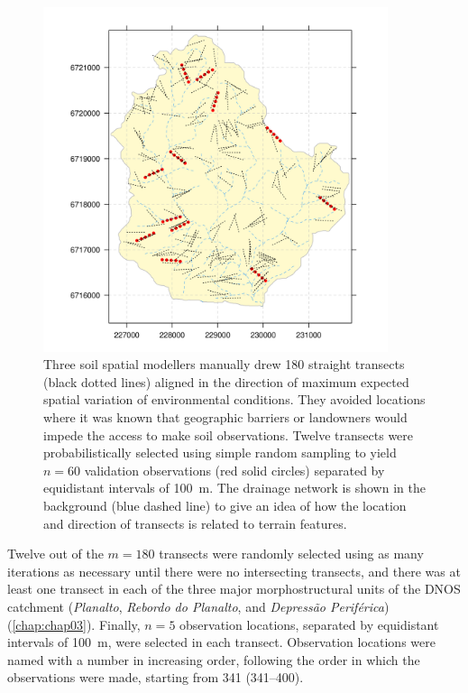 \begin{figure}[!ht]
\centering
\includegraphics[width=0.90\textwidth]{fig/chap04-subset-II}
\caption[Twelve transects were selected using simple random sampling to yield $n = 60$ validation 
observations]{Three soil spatial modellers manually drew 180 straight transects (black dotted lines) aligned 
in the direction of maximum expected spatial variation of environmental conditions. They avoided locations 
where it was known that geographic barriers or landowners would impede the access to make soil observations. 
Twelve transects were probabilistically selected using simple random sampling to yield $n = 60$ validation 
observations (red solid circles) separated by equidistant intervals of \SI{100}{\metre}. The drainage network 
is shown in the background (blue dashed line) to give an idea of how the location and direction of transects 
is related to terrain features.}
\label{fig:chap04-subset-II}
\end{figure}

Twelve out of the $m = 180$ transects were randomly selected using as many iterations as necessary until 
there were no intersecting transects, and there was at least one transect in each of the three major 
morphostructural units of the DNOS catchment (\textit{Planalto}, \textit{Rebordo do Planalto}, and 
\textit{Depressão Periférica}) (\autoref{chap:chap03}). Finally, $n = 5$ observation locations, separated by 
equidistant intervals of \SI{100}{\metre}, were selected in each transect. Observation locations were named 
with a number in increasing order, following the order in which the observations were made, starting from 
\num{341} (\num{341}--\num{400}).

